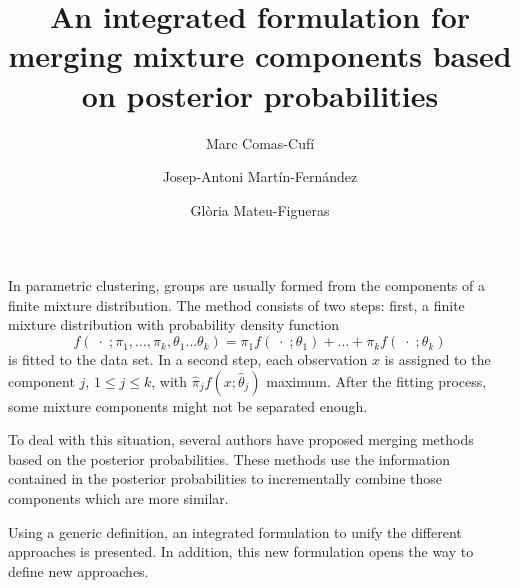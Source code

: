 \documentclass[a4paper,11pt]{article}
\title{An integrated formulation for merging mixture components based on posterior probabilities}
\author{Marc Comas-Cufí \and Josep-Antoni Martín-Fernández \and Glòria Mateu-Figueras}
\begin{document}
\maketitle

In parametric clustering, groups are usually formed from the components of a finite mixture distribution. The method consists of two steps: first, a finite mixture distribution with probability density function
\[
f(\;\cdot\; ; \pi_1, \dots, \pi_k, \theta_1 \dots \theta_k) = \pi_1  f (\;\cdot\; ; \theta_1) + \dots + \pi_k f(\;\cdot\; ; \theta_k)
\]
is fitted to the data set.  In a second step, each observation $x$ is assigned to the component $j$, $1\leq j \leq k$, with $\hat{\pi}_j f( x ; \hat{\theta}_j)$ maximum. After the fitting process, some mixture components might not be separated enough. 

To deal with this situation, several authors have proposed merging methods based on the posterior probabilities. These methods use  the information contained in the posterior probabilities to incrementally combine those components which are more similar. 

Using a generic definition, an integrated formulation to unify the different approaches is presented. In addition, this new formulation opens the way to define new approaches.

%
%
%
%
%
%
\end{document}

